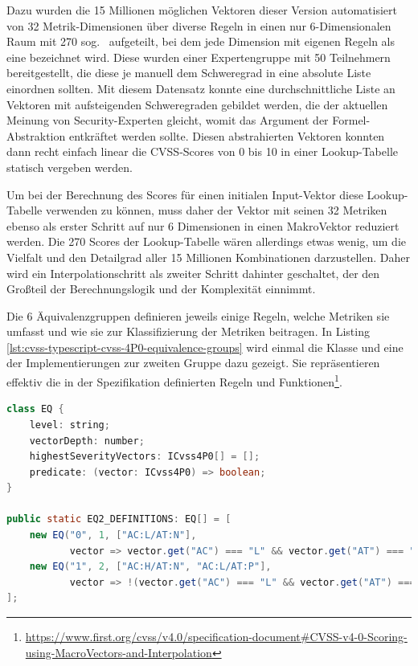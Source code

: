 Dazu wurden die 15 Millionen möglichen Vektoren dieser Version automatisiert von 32 Metrik-Dimensionen über diverse Regeln in einen nur 6-Dimensionalen Raum mit 270 sog.\  aufgeteilt, bei dem jede Dimension mit eigenen Regeln als eine  bezeichnet wird.
Diese wurden einer Expertengruppe mit 50 Teilnehmern bereitgestellt, die diese je manuell dem Schweregrad in eine absolute Liste einordnen sollten.
Mit diesem Datensatz konnte eine durchschnittliche Liste an Vektoren mit aufsteigenden Schweregraden gebildet werden, die der aktuellen Meinung von Security-Experten gleicht, womit das Argument der Formel-Abstraktion entkräftet werden sollte.
Diesen abstrahierten Vektoren konnten dann recht einfach linear die CVSS-Scores von 0 bis 10 in einer Lookup-Tabelle statisch vergeben werden.

Um bei der Berechnung des Scores für einen initialen Input-Vektor diese Lookup-Tabelle verwenden zu können, muss daher der Vektor mit seinen 32 Metriken ebenso als erster Schritt auf nur 6 Dimensionen in einen MakroVektor reduziert werden.
Die 270 Scores der Lookup-Tabelle wären allerdings etwas wenig, um die Vielfalt und den Detailgrad aller 15 Millionen Kombinationen darzustellen.
Daher wird ein Interpolationschritt als zweiter Schritt dahinter geschaltet, der den Großteil der Berechnungslogik und der Komplexität einnimmt.

Die 6 Äquivalenzgruppen definieren jeweils einige Regeln, welche Metriken sie umfasst und wie sie zur Klassifizierung der Metriken beitragen.
In Listing \ref{lst:cvss-typescript-cvss-4P0-equivalence-groups} wird einmal die Klasse  und eine der Implementierungen zur zweiten Gruppe dazu gezeigt.
Sie repräsentieren effektiv die in der Spezifikation definierten Regeln und Funktionen\footnote{\url{https://www.first.org/cvss/v4.0/specification-document#CVSS-v4-0-Scoring-using-MacroVectors-and-Interpolation}}.

\begin{lstlisting}[language=Java, label={lst:cvss-typescript-cvss-4P0-equivalence-groups}, caption={CVSS 4.0 Äquivalenzgruppen in TypeScript}, basicstyle=\scriptsize]
class EQ {
    level: string;
    vectorDepth: number;
    highestSeverityVectors: ICvss4P0[] = [];
    predicate: (vector: ICvss4P0) => boolean;
}

public static EQ2_DEFINITIONS: EQ[] = [
    new EQ("0", 1, ["AC:L/AT:N"],
           vector => vector.get("AC") === "L" && vector.get("AT") === "N"),
    new EQ("1", 2, ["AC:H/AT:N", "AC:L/AT:P"],
           vector => !(vector.get("AC") === "L" && vector.get("AT") === "N"))
];
\end{lstlisting}


